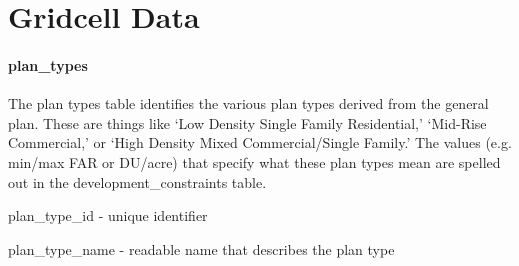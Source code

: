 \chapter{Gridcell Data}

\subsubsection{plan\_types} 

The plan types table identifies the various plan types derived from the general plan. These are things like `Low Density Single Family Residential,' `Mid-Rise Commercial,' or `High Density Mixed Commercial/Single Family.' The values (e.g. min/max FAR or DU/acre) that specify what these plan types mean are spelled out in the development\_constraints table.

\begin{description}
\item plan\_type\_id - unique identifier
\item plan\_type\_name - readable name that describes the plan type 
\end{description}